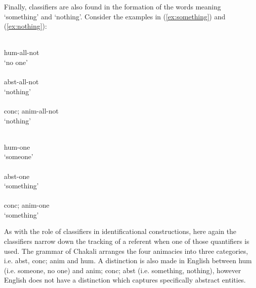 Finally,  classifiers are also found in the formation of the words
meaning  `something' and `nothing'. Consider the examples in 
(\ref{ex:something}) and (\ref{ex:nothing}):


\begin{multicols}{2}
\begin{exe}
  \ex\label{ex:something}
\begin{xlist}
\ex\label{ex:somethingH}
\\
 {\sc hum}-all-not\\
\glt `no one'\\
\ex\label{ex:somethingC}
\\
 {\sc abst}-all-not\\
\glt `nothing'\\
\ex\label{ex:somethingA}
\\
 {\sc  conc; anim}-all-not\\
\glt `nothing'\\
\end{xlist}
\end{exe}

\begin{exe}
  \ex\label{ex:nothing}
\begin{xlist}
\ex\label{ex:somethingH}
\\
 {\sc hum}-one\\
\glt `someone'\\
\ex\label{ex:somethingC}
\\
 {\sc abst}-one\\
\glt `something'\\
\ex\label{ex:somethingA}
\\
 {\sc conc; anim}-one\\
\glt `something'\\
\end{xlist}
\end{exe}
\end{multicols}

As with the role of classifiers in identificational constructions, here again
the classifiers narrow down the tracking of a  referent when one of those
quantifiers is used. The grammar of Chakali arranges the four animacies into
three categories, i.e.  {\sc abst}, {\sc conc; anim} and {\sc hum}.  A
distinction is also made in English between {\sc hum} (i.e. someone, no one) and
 {\sc anim; conc; abst} (i.e. something, nothing), however English does not have
a distinction which captures  specifically abstract entities.

